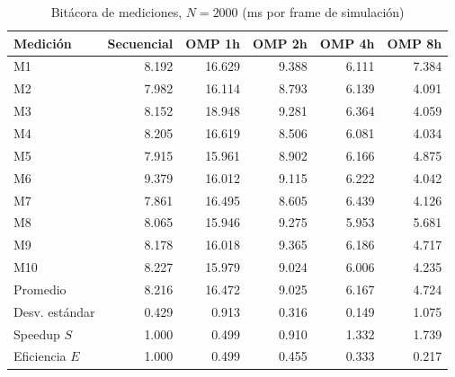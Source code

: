 \begin{table}[H]
\centering\small
\caption{Bitácora de mediciones, $N=2000$ (ms por frame de simulación)}
\begin{tabular}{lrrrrr}
\toprule
Medición & Secuencial & OMP 1h & OMP 2h & OMP 4h & OMP 8h \\
\midrule
M1 & 8.192 & 16.629 & 9.388 & 6.111 & 7.384 \\
M2 & 7.982 & 16.114 & 8.793 & 6.139 & 4.091 \\
M3 & 8.152 & 18.948 & 9.281 & 6.364 & 4.059 \\
M4 & 8.205 & 16.619 & 8.506 & 6.081 & 4.034 \\
M5 & 7.915 & 15.961 & 8.902 & 6.166 & 4.875 \\
M6 & 9.379 & 16.012 & 9.115 & 6.222 & 4.042 \\
M7 & 7.861 & 16.495 & 8.605 & 6.439 & 4.126 \\
M8 & 8.065 & 15.946 & 9.275 & 5.953 & 5.681 \\
M9 & 8.178 & 16.018 & 9.365 & 6.186 & 4.717 \\
M10 & 8.227 & 15.979 & 9.024 & 6.006 & 4.235 \\
\midrule
Promedio & 8.216 & 16.472 & 9.025 & 6.167 & 4.724 \\
Desv. estándar & 0.429 & 0.913 & 0.316 & 0.149 & 1.075 \\
Speedup $S$ & 1.000 & 0.499 & 0.910 & 1.332 & 1.739 \\
Eficiencia $E$ & 1.000 & 0.499 & 0.455 & 0.333 & 0.217 \\
\bottomrule
\end{tabular}
\end{table}

